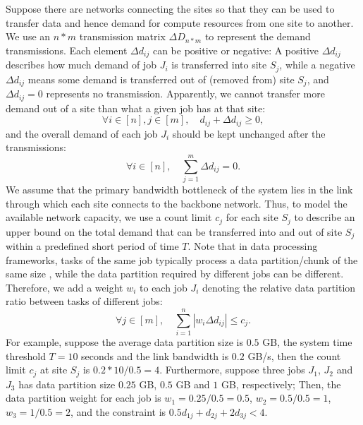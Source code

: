 Suppose there are networks connecting the sites so that they can be used to transfer data and hence demand for compute resources from one site to another. We use an $n*m$ transmission matrix $\Delta D_{n*m}$ to represent the demand transmissions. Each element $\Delta d_{ij}$ can be positive or negative: A positive $\Delta d_{ij}$ describes how much demand of job $J_i$ is transferred into site $S_j$, while a negative $\Delta d_{ij}$ means some demand is transferred out of (removed from) site $S_j$, and $\Delta d_{ij} = 0$ represents no transmission. Apparently, we cannot transfer more demand out of a site than what a given job has at that site:
\begin{equation}
    \forall i\in[n], j\in[m], \quad d_{ij} + \Delta d_{ij} \geq 0,
\label{eq:trx1}
\end{equation}
and the overall demand of each job $J_i$ should be kept unchanged after the transmissions:
\begin{equation}
    \forall i\in[n], \quad \sum_{j=1}^m \Delta d_{ij}=0.
\label{eq:trx2}
\end{equation}
We assume that the primary bandwidth bottleneck of the system lies in the link through which each site connects to the backbone network. Thus, to model the available network capacity, we use a count limit $c_j$ for each site $S_j$ to describe an upper bound on the total demand that can be transferred into and out of site $S_j$ within a predefined short period of time $T$. Note that in data processing frameworks, tasks of the same job typically process a data partition/chunk of the same size \cite{copart}, while the data partition required by different jobs can be different. Therefore, we add a weight $w_i$ to each job $J_i$ denoting the relative data partition ratio between tasks of different jobs:
\begin{equation}
    \forall j\in[m], \quad \sum_{i=1}^n |w_i \Delta d_{ij}| \leq c_j. %
\label{eq:trx3}
\end{equation}
For example, suppose the average data partition size is $0.5$ GB, the system time threshold $T=10$ seconds and the link bandwidth is $0.2$ GB/s, then the count limit $c_j$ at site $S_j$ is $0.2*10/0.5 = 4$. Furthermore, suppose three jobs $J_1$, $J_2$ and $J_3$ has data partition size $0.25$ GB, $0.5$ GB and $1$ GB, respectively; Then, the data partition weight for each job is $w_1 = 0.25/0.5 = 0.5$, $w_2 = 0.5/0.5=1$, $w_3 = 1/0.5=2$, and the constraint is $0.5 d_{1j} + d_{2j} + 2 d_{3j} < 4$. %

